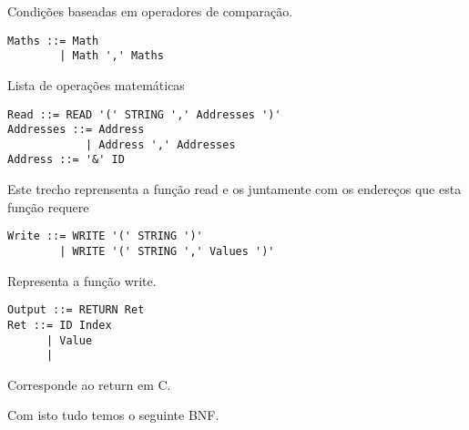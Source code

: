 \documentclass[12pt,a4paper]{report}
\begin{document}
Condições baseadas em operadores de comparação.
\begin{lstlisting}
Maths ::= Math
        | Math ',' Maths
\end{lstlisting}
Lista de operações matemáticas
\begin{lstlisting}
Read ::= READ '(' STRING ',' Addresses ')'
Addresses ::= Address
            | Address ',' Addresses
Address ::= '&' ID
\end{lstlisting}
Este trecho reprensenta a função read e os juntamente com os endereços que esta função requere
\begin{lstlisting}
Write ::= WRITE '(' STRING ')'
        | WRITE '(' STRING ',' Values ')'
\end{lstlisting}
Representa a função write.
\begin{lstlisting}
Output ::= RETURN Ret
Ret ::= ID Index
      | Value
      | 
\end{lstlisting}
Corresponde ao return em C.

 
Com isto tudo temos o seguinte BNF.
\end{document}
